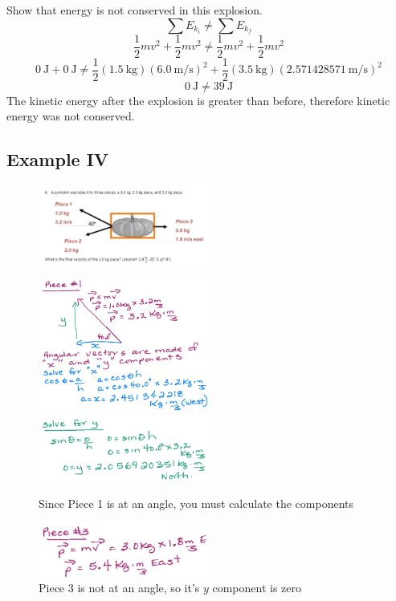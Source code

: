 \documentclass[a4paper,12pt]{article}
\begin{document}
Show that energy is not conserved in this explosion.
$$\sum{E_{k_i}} \neq \sum{E_{k_f}}$$
$$\frac{1}{2}mv^2 + \frac{1}{2}mv^2 \neq \frac{1}{2}mv^2 + \frac{1}{2}mv^2$$
$$\SI{0}{\J} + \SI{0}{\J} \neq \frac{1}{2}(\SI{1.5}{\kg})(\SI{6.0}{\m\per\s})^2 + \frac{1}{2}(\SI{3.5}{\kg})(\SI{2.571428571}{\m\per\s})^2$$
$$\SI{0}{\J} \neq \SI{39}{\J}$$
The kinetic energy after the explosion is greater than before, therefore kinetic energy was not conserved.

\pagebreak
\subsection{Example IV}
\begin{figure}[H]
    \centering
    \includegraphics[width=0.50\textwidth]{q-explode-4}
\end{figure}
\begin{figure}[H]
    \centering
    \caption{Since Piece 1 is at an angle, you must calculate the components}
    \includegraphics[width=0.50\textwidth]{q-explode-4a}
    \includegraphics[width=0.50\textwidth]{q-explode-4b}
\end{figure}
\begin{figure}[H]
    \centering
    \caption{Piece 3 is not at an angle, so it's $y$ component is zero}
    \includegraphics[width=0.50\textwidth]{q-explode-4c}
\end{figure}
\end{document}
